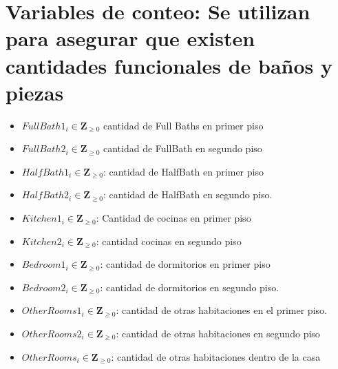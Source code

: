 \section{Variables de conteo: Se utilizan para asegurar que existen cantidades funcionales de baños y piezas}
\begin{itemize}
    \item $FullBath1_{i}\in \mathbf{Z}_{\geq 0}$ cantidad de Full Baths en primer piso
    \item $FullBath2_{i}\in \mathbf{Z}_{\geq 0}$ cantidad de FullBath en segundo piso
    \item $HalfBath1_{i} \in \mathbf{Z}_{\geq 0}$: cantidad de HalfBath en primer piso
    \item $HalfBath2_{i} \in \mathbf{Z}_{\geq 0}$: cantidad de HalfBath en segundo piso.
    \item $Kitchen1_{i} \in \mathbf{Z}_{\geq 0}$: Cantidad de cocinas en primer piso
    \item $Kitchen2_{i} \in \mathbf{Z}_{\geq 0}$: cantidad cocinas en segundo piso
    \item $Bedroom1_{i} \in \mathbf{Z}_{\geq 0}$: cantidad de dormitorios en primer piso
    \item $Bedroom2_{i}\in \mathbf{Z}_{\geq 0}$: cantidad de dormitorios en segundo piso.
    \item $OtherRooms1_{i}\in \mathbf{Z}_{\geq 0}$: cantidad de otras habitaciones en el primer piso.
    \item $OtherRooms2_{i}\in \mathbf{Z}_{\geq 0}$: cantidad de otras habitaciones en segundo piso
    \item $OtherRooms_{i}\in \mathbf{Z}_{\geq 0}$: cantidad de otras habitaciones dentro de la casa
\end{itemize}
